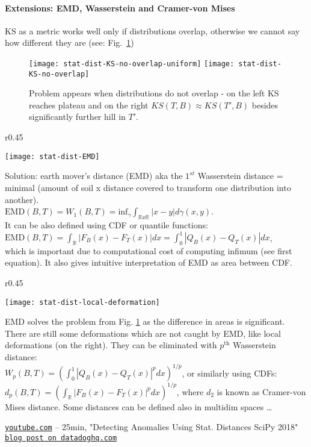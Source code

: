 \documentclass{article}
\begin{document}
\FloatBarrier

\paragraph{Extensions: EMD, Wasserstein and Cramer-von Mises}
KS as a metric works well only if distributions overlap, otherwise we cannot say how different they are (see: Fig.~\ref{fig:stat-dist-no-overlap})

\begin{figure}[ht]
	\centering
	\texttt{[image: stat-dist-KS-no-overlap-uniform]}
	\texttt{[image: stat-dist-KS-no-overlap]}
  \caption{Problem appears when distributions do not overlap - on the left KS reaches plateau and on the right $KS(T,B) \approx KS(T',B)$ besides significantly further hill in $T'$.}
  \label{fig:stat-dist-no-overlap}
\end{figure}


\begin{wrapfigure}[4]{r}{0.45\textwidth}
  \begin{center}
  	\vspace{-3em}
	\texttt{[image: stat-dist-EMD]}
  \end{center}
\end{wrapfigure}

Solution: earth mover's distance (EMD) aka the $1^{st}$ Wasserstein distance = minimal (amount of soil x distance covered to transform one distribution into another). \\ $\mathrm{EMD}(B,T) = W_1 (B,T) = \mathrm{inf}_{\gamma} \int_{\mathbb{R}x\mathbb{R}} |x-y| d\gamma(x,y)$. \\
It can be also defined using CDF or quantile functions: \\ $\mathrm{EMD}(B,T) = \int_\mathbb{R} |F_B(x) - F_T(x)| dx = \int_0^1 |Q_B(x) - Q_T(x)| dx$, \\ which is important due to computational cost of computing infimum (see first equation). It also gives intuitive interpretation of EMD as area between CDF.

\begin{wrapfigure}[7]{r}{0.45\textwidth}
  \begin{center}
  	\vspace{-2em}
	\texttt{[image: stat-dist-local-deformation]}
  \end{center}
\end{wrapfigure}

EMD solves the problem from Fig. \ref{fig:stat-dist-no-overlap} as the difference in areas is significant. 
There are still some deformations which are not caught by EMD, like local deformations (on the right). They can be eliminated with $p^\mathrm{th}$ Wasserstein distance: \\ 
$W_p (B,T) = (\int_0^1 |Q_B(x) - Q_T(x)|^p dx)^{1/p}$,
or similarly using CDFs:\\ 
$d_p (B,T) = (\int_\mathbb{R} |F_B(x) - F_T(x)|^p dx)^{1/p}$, where $d_2$ is known as Cramer-von Mises distance.
Some distances can be defined also in multidim spaces \dots

\noindent
\href{https://youtu.be/U7xdiGc7IRU}{\texttt{youtube.com}} -- 25min, "Detecting Anomalies Using Stat. Distances SciPy 2018" \\
\href{https://www.datadoghq.com/blog/engineering/robust-statistical-distances-for-machine-learning/}{\texttt{blog post on datadoghq.com} }
\end{document}
